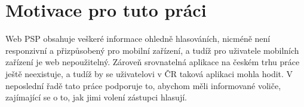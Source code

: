 \section{Motivace pro tuto práci}
Web PSP obsahuje veškeré informace ohledně hlasováních, nicméně není responzivní a přizpůsobený pro mobilní zařízení, a tudíž pro uživatele mobilních zařízení je web nepoužitelný. Zároveň srovnatelná aplikace na českém trhu práce ještě neexistuje, a tudíž by se uživatelovi v ČR taková aplikaci mohla hodit. V neposlední řadě tato práce podporuje to, abychom měli informované voliče, zajímající se o to, jak jimi volení zástupci hlasují.